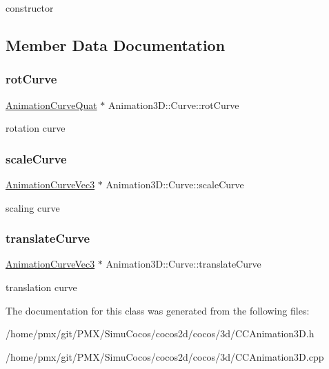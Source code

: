 constructor 

\subsection{Member Data Documentation}
\mbox{\label{classAnimation3D_1_1Curve_af6fa1e201c58c4f01dd221c4bdc0f3c9}} 
\subsubsection{\texorpdfstring{rot\+Curve}{rotCurve}}
{\footnotesize\ttfamily \hyperlink{classAnimationCurve}{Animation\+Curve\+Quat} $\ast$ Animation3\+D\+::\+Curve\+::rot\+Curve}

rotation curve \mbox{\label{classAnimation3D_1_1Curve_a5e3b6cac30f4ede5a387a2766ea86704}} 
\subsubsection{\texorpdfstring{scale\+Curve}{scaleCurve}}
{\footnotesize\ttfamily \hyperlink{classAnimationCurve}{Animation\+Curve\+Vec3} $\ast$ Animation3\+D\+::\+Curve\+::scale\+Curve}

scaling curve \mbox{\label{classAnimation3D_1_1Curve_a12a49cdd9de1928a555c097b0593df79}} 
\subsubsection{\texorpdfstring{translate\+Curve}{translateCurve}}
{\footnotesize\ttfamily \hyperlink{classAnimationCurve}{Animation\+Curve\+Vec3} $\ast$ Animation3\+D\+::\+Curve\+::translate\+Curve}

translation curve 

The documentation for this class was generated from the following files\+:\begin{DoxyCompactItemize}
\item 
/home/pmx/git/\+P\+M\+X/\+Simu\+Cocos/cocos2d/cocos/3d/C\+C\+Animation3\+D.\+h\item 
/home/pmx/git/\+P\+M\+X/\+Simu\+Cocos/cocos2d/cocos/3d/C\+C\+Animation3\+D.\+cpp\end{DoxyCompactItemize}
